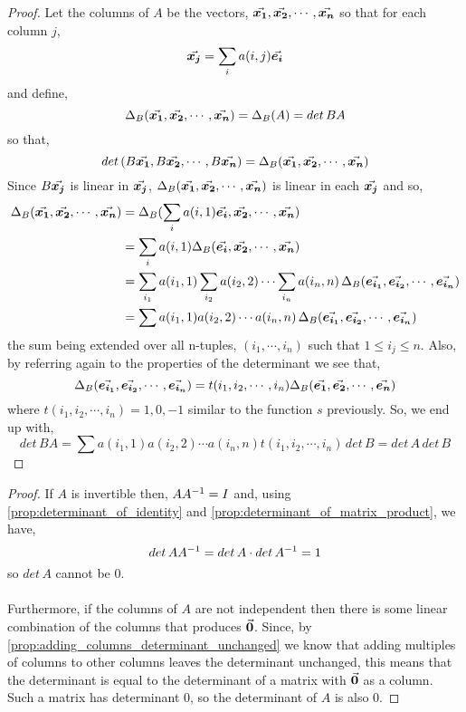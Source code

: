 \documentclass[../MathsNotesBase.tex]{subfiles}
\begin{document}
{		
		\begin{proof}
			Let the columns of $A$ be the vectors, $\vec{\bm{x_1}}, \vec{\bm{x_2}}, \cdots , \vec{\bm{x_n}}$ so that for each column $j$,\\
			\[ \vec{\bm{x_j}} = \sum_{i} a(i,j)\vec{\bm{e_i}} \]
			and define,
			\[ \Delta_B(\vec{\bm{x_1}}, \vec{\bm{x_2}}, \cdots , \vec{\bm{x_n}}) = \Delta_B(A) = det\,BA \]
			so that,
			\[ det\,(B\vec{\bm{x_1}}, B\vec{\bm{x_2}}, \cdots , B\vec{\bm{x_n}}) = \Delta_B(\vec{\bm{x_1}}, \vec{\bm{x_2}}, \cdots , \vec{\bm{x_n}}) \] 
			Since $B\vec{\bm{x_j}}$ is linear in $\vec{\bm{x_j}}$, $\Delta_B(\vec{\bm{x_1}}, \vec{\bm{x_2}}, \cdots , \vec{\bm{x_n}})$ is linear in each $\vec{\bm{x_j}}$ and so,
			\begin{align*}
				\Delta_B(\vec{\bm{x_1}}, \vec{\bm{x_2}}, \cdots , \vec{\bm{x_n}}) &= \Delta_B(\sum_{i} a(i,1)\vec{\bm{e_i}}, \vec{\bm{x_2}}, \cdots , \vec{\bm{x_n}})\\
				&= \sum_{i} a(i,1)\Delta_B(\vec{\bm{e_i}}, \vec{\bm{x_2}}, \cdots , \vec{\bm{x_n}})\\
				&= \sum_{i_1} a(i_1,1)\sum_{i_2} a(i_2,2) \cdots \sum_{i_n} a(i_n,n)\,\Delta_B(\vec{\bm{e_{i_1}}}, \vec{\bm{e_{i_2}}}, \cdots , \vec{\bm{e_{i_n}}})\\
				&= \sum a(i_1,1) a(i_2,2) \cdots a(i_n,n)\,\Delta_B(\vec{\bm{e_{i_1}}}, \vec{\bm{e_{i_2}}}, \cdots , \vec{\bm{e_{i_n}}})
			\end{align*}
			the sum being extended over all n-tuples, $(i_1, \cdots , i_n)$ such that \mbox{$1 \leq i_j \leq n$}. Also, by referring again to the properties of the determinant we see that,
			\[ \Delta_B(\vec{\bm{e_{i_1}}}, \vec{\bm{e_{i_2}}}, \cdots , \vec{\bm{e_{i_n}}}) = t(i_1, i_2, \cdots , i_n)\Delta_B(\vec{\bm{e_1}}, \vec{\bm{e_2}}, \cdots , \vec{\bm{e_n}}) \]
			where $t(i_1, i_2, \cdots , i_n) = 1, 0, -1$ similar to the function $s$ previously. So, we end up with,
			\[ det\,BA = \sum a(i_1,1) a(i_2,2) \cdots a(i_n,n) t(i_1, i_2, \cdots , i_n)\,det\,B = det\,A\,det\,B \]
		\end{proof}
	
		\begin{proof}
			If $A$ is invertible then, $A{A}^{-1} = I$ and, using \autoref{prop:determinant_of_identity} and \autoref{prop:determinant_of_matrix_product}, we have,
			\[ det\,A{A}^{-1} = det\,A \cdot det\,{A}^{-1} = 1 \]
			so $det\,A$ cannot be $0$.
			\paragraph{} Furthermore, if the columns of $A$ are not independent then there is some linear combination of the columns that produces $\vec{\bm{0}}$. Since, by \autoref{prop:adding_columns_determinant_unchanged} we know that adding multiples of columns to other columns leaves the determinant unchanged, this means that the determinant is equal to the determinant of a matrix with $\vec{\bm{0}}$ as a column. Such a matrix has determinant 0, so the determinant of $A$ is also 0.
		\end{proof}
	
}
\end{document}
